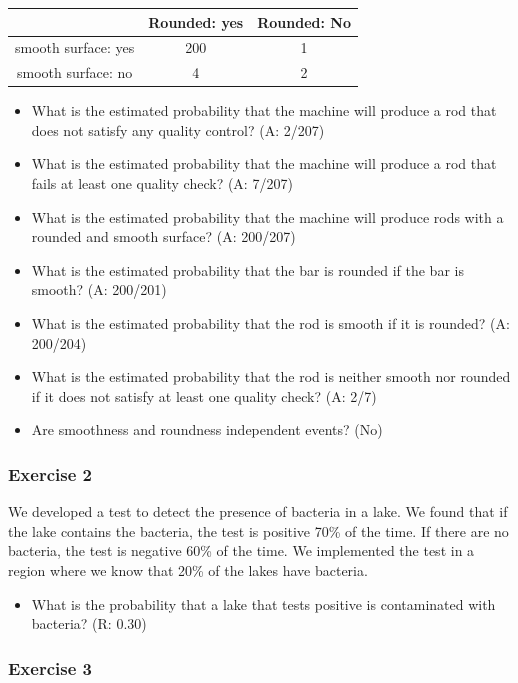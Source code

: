 \documentclass[
]{book}
\providecommand{\tightlist}{%
  \setlength{\itemsep}{0pt}\setlength{\parskip}{0pt}}
\begin{document}
\begin{longtable}[]{@{}ccc@{}}
\toprule
& Rounded: yes & Rounded: No \\
\midrule
\endhead
smooth surface: yes & 200 & 1 \\
smooth surface: no & 4 & 2 \\
\bottomrule
\end{longtable}

\begin{itemize}
\item
  What is the estimated probability that the machine will produce a rod that does not satisfy any quality control? (A: 2/207)
\item
  What is the estimated probability that the machine will produce a rod that fails at least one quality check? (A: 7/207)
\item
  What is the estimated probability that the machine will produce rods with a rounded and smooth surface? (A: 200/207)
\item
  What is the estimated probability that the bar is rounded if the bar is smooth? (A: 200/201)
\item
  What is the estimated probability that the rod is smooth if it is rounded? (A: 200/204)
\item
  What is the estimated probability that the rod is neither smooth nor rounded if it does not satisfy at least one quality check? (A: 2/7)
\item
  Are smoothness and roundness independent events? (No)
\end{itemize}

\hypertarget{exercise-2-1}{%
\subsubsection{Exercise 2}\label{exercise-2-1}}

We developed a test to detect the presence of bacteria in a lake. We found that if the lake contains the bacteria, the test is positive 70\% of the time. If there are no bacteria, the test is negative 60\% of the time. We implemented the test in a region where we know that 20\% of the lakes have bacteria.

\begin{itemize}
\tightlist
\item
  What is the probability that a lake that tests positive is contaminated with bacteria? (R: 0.30)
\end{itemize}

\hypertarget{exercise-3-1}{%
\subsubsection{Exercise 3}\label{exercise-3-1}}
\end{document}
